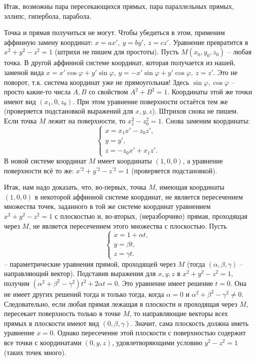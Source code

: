 \documentclass[a4paper, 12pt]{article}
\theoremstyle{definition}
\begin{document}
Итак, возможны пара пересекающихся прямых, пара параллельных прямых, эллипс, гипербола, парабола.

Точка и прямая получиться не могут. Чтобы убедиться в этом, применим аффинную замену координат:
$x = ax', \ y = by', \ z = cz'$.
Уравнение превратится в $x^2+y^2-z^2=1$ (штрихи не пишем для простоты).
Пусть $M(x_0, y_0, z_0)$ – любая точка. В другой аффинной системе координат, которая получается из нашей, заменой вида
$x = x' \cos{\varphi} + y' \sin{\varphi}, \ y = -x' \sin{\varphi} + y' \cos{\varphi}, \ z = z'$.
Это не поворот, т.к. система координат уже не прямоугольная!
Здесь $\sin{\varphi}, \cos{\varphi}$ – просто какие-то числа $A, B$ со свойством $A^2 + B^2 = 1$.
Координаты этой же точки имеют вид $(x_1, 0, z_0)$.
При этом уравнение поверхности остаётся тем же (проверяется подстановкой выражений для $x,y,z$).
Штрихов снова не пишем.
Если точка $M$ лежит на поверхности, то $x_1^2 - z_0^2 = 1$. Снова заменим координаты:
\[\begin{cases}
    x = x_1 x' - z_0 z', \\
    y = y', \\
    z = -z_0 x' + x_1 z'.
\end{cases}\]
В новой системе координат $M$ имеет координаты $(1,0,0)$, а уравнение поверхности всё то же:
$x^{'2} + y^{'2} - z^{'2} = 1$ (проверяется подстановкой).

Итак, нам надо доказать, что, во-первых, точка $M$, имеющая координаты $(1,0,0)$ в некоторой аффинной системе координат, не является пересечением множества точек, заданного в той же системе координат уравнением
$x^2 + y^2 - z^2 = 1$ с плоскостью и, во-вторых, (неразборчиво) прямая, проходящая через $M$, не является пересечением этого множества с плоскостью.
Пусть
\[\begin{cases}
    x = 1 + \alpha t, \\
    y = \beta t, \\
    z = \gamma t.
\end{cases}\]
– параметрические уравнения прямой, проходящей через $M$ (тогда $(\alpha, \beta, \gamma)$ – направляющий вектор).
Подставив выражения для $x,y,z$ в $x^2+y^2-z^2=1$, получим
$(\alpha^2 + \beta^2 - \gamma^2)t^2 + 2 \alpha t = 0$.
Это уравнение имеет решение $t = 0$. Она не имеет других решений тогда и только тогда, когда $\alpha = 0$ и $\alpha^2 + \beta^2 - \gamma^2 \neq 0$.
Следовательно, если любая прямая лежащая в плоскости и проходящая через $M$, пересекает поверхность только в точке $M$, то направляющие векторы всех прямых в плоскости имеют вид $(0, \beta, \gamma)$.
Значит, сама плоскость должна иметь уравнение $x = 0$.
Однако пересечение этой плоскости с поверхностью содержит все точки с координатами $(0,y,z)$, удовлетворяющими условию $y^2 - z^2 = 1$ (таких точек много).
\end{document}
